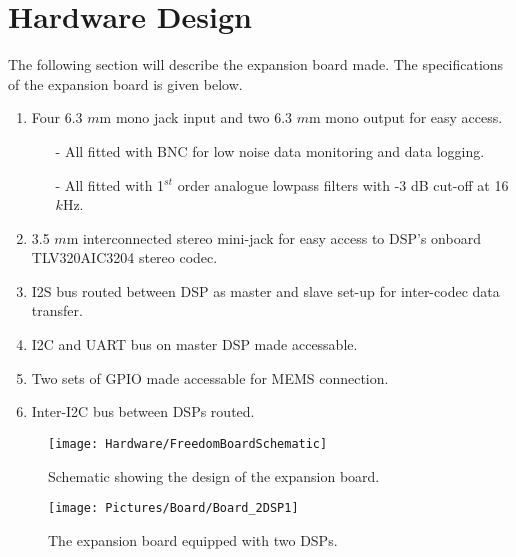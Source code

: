 \section{Hardware Design}
The following section will describe the expansion board made. The specifications of the expansion board is given below.%




\begin{enumerate}
	\item Four 6.3 $m$m mono jack input and two 6.3 $m$m mono output for easy access.
	\begin{itemize}
		\item[-] All fitted with BNC for low noise data monitoring and data logging.
		\item[-] All fitted with 1$^{st}$ order analogue lowpass filters with -3 dB cut-off at 16 $k$Hz.
	\end{itemize}
	\item 3.5 $m$m interconnected stereo mini-jack for easy access to DSP's onboard TLV320AIC3204 stereo codec.
	\item I2S bus routed between DSP as master and slave set-up for inter-codec data transfer.
	\item I2C and UART bus on master DSP made accessable.
	\item Two sets of GPIO made accessable for MEMS connection.
	\item Inter-I2C bus between DSPs routed. 
\end{enumerate}


\begin{figure}[H]
	\centering
	\texttt{[image: Hardware/FreedomBoardSchematic]}	
	\caption{Schematic showing the design of the expansion board.}
	\label{fig:PCBboardSchem}
\end{figure}


\begin{figure}[H]
	\centering
	\texttt{[image: Pictures/Board/Board\_2DSP1]}	
	\caption{The expansion board equipped with two DSPs.}
	\label{fig:PCBboard}
\end{figure}

